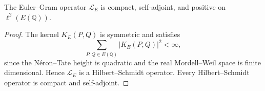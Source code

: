 \begin{lemma}
The Euler--Gram operator $\mathcal L_E$ is compact, self-adjoint, and positive
on $\ell^2(E(\mathbb{Q}))$.
\end{lemma}

\begin{proof}
The kernel $K_E(P,Q)$ is symmetric and satisfies
\[
\sum_{P,Q \in E(\mathbb{Q})} |K_E(P,Q)|^2 < \infty,
\]
since the Néron--Tate height is quadratic and the real Mordell--Weil space is
finite dimensional. Hence $\mathcal L_E$ is a Hilbert--Schmidt operator.
Every Hilbert--Schmidt operator is compact and self-adjoint.
\end{proof}

